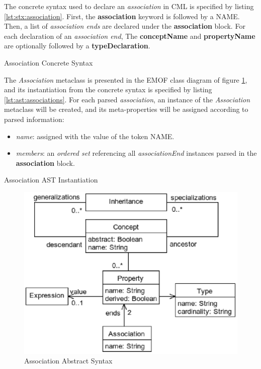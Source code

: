 The concrete syntax used to declare an \emph{association} in CML
is specified by listing \ref{lst:stx:association}.
First, the \textbf{association} keyword is followed by a NAME.
Then, a list of \emph{association ends} are declared under the \textbf{association} block.
For each declaration of an \emph{association end},
The \textbf{conceptName} and \textbf{propertyName} are optionally followed by a \textbf{typeDeclaration}.

\begin{code}
\verbatimfont{\small}

\caption{Association Concrete Syntax}
\label{lst:stx:association}
\end{code}

The \emph{Association} metaclass is presented
in the EMOF \cite{mof} class diagram of figure \ref{fig:meta:association},
and its instantiation from the concrete syntax is specified by listing \ref{lst:ast:associations}.
For each parsed \emph{association},
an instance of the \emph{Association} metaclass will be created,
and its meta-properties will be assigned
according to parsed information:

\begin{itemize}

\item \emph{name}:
assigned with the value of the token NAME.

\item \emph{members}:
an \emph{ordered set} referencing all \emph{associationEnd}
instances parsed in the \textbf{association} block.

\end{itemize}

\begin{code}
\verbatimfont{\small}

\caption{Association AST Instantiation}
\label{lst:ast:associations}
\end{code}

\begin{figure}
\centering
\includegraphics[width=1.0\textwidth]{metamodel/association}
\caption{Association Abstract Syntax}
\label{fig:meta:association}
\end{figure}
